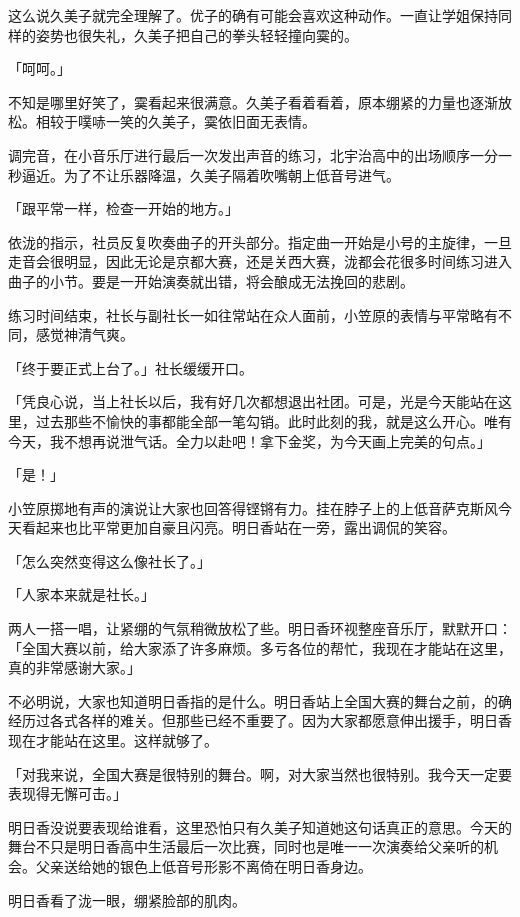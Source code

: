 \documentclass[UTF8]{ctexart}
\begin{document}
    这么说久美子就完全理解了。优子的确有可能会喜欢这种动作。一直让学姐保持同样的姿势也很失礼，久美子把自己的拳头轻轻撞向霙的。 

    「呵呵。」 

    不知是哪里好笑了，霙看起来很满意。久美子看着看着，原本绷紧的力量也逐渐放松。相较于噗哧一笑的久美子，霙依旧面无表情。 

    调完音，在小音乐厅进行最后一次发出声音的练习，北宇治高中的出场顺序一分一秒逼近。为了不让乐器降温，久美子隔着吹嘴朝上低音号进气。 

    「跟平常一样，检查一开始的地方。」 

    依泷的指示，社员反复吹奏曲子的开头部分。指定曲一开始是小号的主旋律，一旦走音会很明显，因此无论是京都大赛，还是关西大赛，泷都会花很多时间练习进入曲子的小节。要是一开始演奏就出错，将会酿成无法挽回的悲剧。 

    练习时间结束，社长与副社长一如往常站在众人面前，小笠原的表情与平常略有不同，感觉神清气爽。 

    「终于要正式上台了。」社长缓缓开口。 

    「凭良心说，当上社长以后，我有好几次都想退出社团。可是，光是今天能站在这里，过去那些不愉快的事都能全部一笔勾销。此时此刻的我，就是这么开心。唯有今天，我不想再说泄气话。全力以赴吧！拿下金奖，为今天画上完美的句点。」 

    「是！」 

    小笠原掷地有声的演说让大家也回答得铿锵有力。挂在脖子上的上低音萨克斯风今天看起来也比平常更加自豪且闪亮。明日香站在一旁，露出调侃的笑容。 

    「怎么突然变得这么像社长了。」 

    「人家本来就是社长。」 

    两人一搭一唱，让紧绷的气氛稍微放松了些。明日香环视整座音乐厅，默默开口：「全国大赛以前，给大家添了许多麻烦。多亏各位的帮忙，我现在才能站在这里，真的非常感谢大家。」 

    不必明说，大家也知道明日香指的是什么。明日香站上全国大赛的舞台之前，的确经历过各式各样的难关。但那些已经不重要了。因为大家都愿意伸出援手，明日香现在才能站在这里。这样就够了。 

    「对我来说，全国大赛是很特别的舞台。啊，对大家当然也很特别。我今天一定要表现得无懈可击。」 

    明日香没说要表现给谁看，这里恐怕只有久美子知道她这句话真正的意思。今天的舞台不只是明日香高中生活最后一次比赛，同时也是唯一一次演奏给父亲听的机会。父亲送给她的银色上低音号形影不离倚在明日香身边。 

    明日香看了泷一眼，绷紧脸部的肌肉。 
\end{document}
